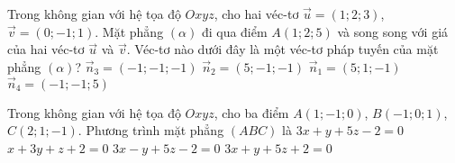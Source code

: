 \begin{ex}%
	Trong không gian với hệ tọa độ $Oxyz$, cho hai véc-tơ $\overrightarrow{u}=(1;2;3)$, $\overrightarrow{v}=(0;-1;1)$. Mặt phẳng $(\alpha)$ đi qua điểm $A(1;2;5)$ và song song với giá của hai véc-tơ $\overrightarrow{u}$ và $\overrightarrow{v}$. Véc-tơ nào dưới đây là một véc-tơ pháp tuyến của mặt phẳng $(\alpha)$?
	\choice
	{$\overrightarrow{n}_3=(-1;-1;-1)$}
	{\True $\overrightarrow{n}_2=(5;-1;-1)$}
	{$\overrightarrow{n}_1=(5;1;-1)$}
	{$\overrightarrow{n}_4=(-1;-1;5)$}
\end{ex}

\begin{ex}%
	Trong không gian với hệ tọa độ $Oxyz$, cho ba điểm $A(1;-1;0)$, $B(-1;0;1)$, $C(2;1;-1)$. Phương trình mặt phẳng $(ABC)$ là
	\choice
	{\True $3x+y+5z-2=0$}
	{$x+3y+z+2=0$}
	{$3x-y+5z-2=0$}
	{$3x+y+5z+2=0$}
\end{ex}

